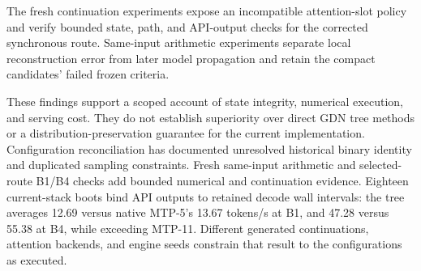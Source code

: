 \documentclass[conference]{IEEEtran}
\begin{document}
The fresh continuation experiments expose an incompatible attention-slot policy and verify bounded state, path, and API-output checks for the corrected synchronous route. Same-input arithmetic experiments separate local reconstruction error from later model propagation and retain the compact candidates' failed frozen criteria.

These findings support a scoped account of state integrity, numerical execution, and serving cost. They do not establish superiority over direct GDN tree methods or a distribution-preservation guarantee for the current implementation. Configuration reconciliation has documented unresolved historical binary identity and duplicated sampling constraints. Fresh same-input arithmetic and selected-route B1/B4 checks add bounded numerical and continuation evidence. Eighteen current-stack boots bind API outputs to retained decode wall intervals: the tree averages 12.69 versus native MTP-5's 13.67 tokens/s at B1, and 47.28 versus 55.38 at B4, while exceeding MTP-11. Different generated continuations, attention backends, and engine seeds constrain that result to the configurations as executed.

\label{ReferencesStart}


\end{document}
